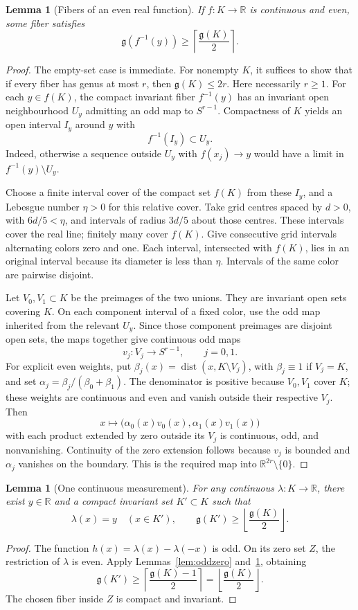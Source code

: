 \documentclass[11pt,a4paper]{article}
\newtheorem{lemma}[theorem]{Lemma}
\theoremstyle{remark}
\newcommand{\R}{\mathbb R}
\newcommand{\gen}{\mathfrak g}
\newcommand{\dist}{\operatorname{dist}}
\begin{document}
\begin{lemma}[Fibers of an even real function]\label{lem:evenfiber}
If $f:K\to\R$ is continuous and even, some fiber satisfies
\[
 \gen(f^{-1}(y))\ge\left\lceil\frac{\gen(K)}2\right\rceil.
\]
\end{lemma}
\begin{proof}
The empty-set case is immediate. For nonempty $K$, it suffices to show that if every fiber has genus at most $r$, then $\gen(K)\le2r$. Here necessarily $r\ge1$. For each $y\in f(K)$, the compact invariant fiber $f^{-1}(y)$ has an invariant open neighbourhood $U_y$ admitting an odd map to $S^{r-1}$. Compactness of $K$ yields an open interval $I_y$ around $y$ with
\[
 f^{-1}(I_y)\subset U_y.
\]
Indeed, otherwise a sequence outside $U_y$ with $f(x_j)\to y$ would have a limit in $f^{-1}(y)\setminus U_y$.

Choose a finite interval cover of the compact set $f(K)$ from these $I_y$, and a Lebesgue number $\eta>0$ for this relative cover. Take grid centres spaced by $d>0$, with $6d/5<\eta$, and intervals of radius $3d/5$ about those centres. These intervals cover the real line; finitely many cover $f(K)$. Give consecutive grid intervals alternating colors zero and one. Each interval, intersected with $f(K)$, lies in an original interval because its diameter is less than $\eta$. Intervals of the same color are pairwise disjoint.

Let $V_0,V_1\subset K$ be the preimages of the two unions. They are invariant open sets covering $K$. On each component interval of a fixed color, use the odd map inherited from the relevant $U_y$. Since those component preimages are disjoint open sets, the maps together give continuous odd maps
\[
 v_j:V_j\to S^{r-1},\qquad j=0,1.
\]
For explicit even weights, put $\beta_j(x)=\dist(x,K\setminus V_j)$, with $\beta_j\equiv1$ if $V_j=K$, and set $\alpha_j=\beta_j/(\beta_0+\beta_1)$. The denominator is positive because $V_0,V_1$ cover $K$; these weights are continuous and even and vanish outside their respective $V_j$. Then
\[
 x\longmapsto\bigl(\alpha_0(x)v_0(x),\alpha_1(x)v_1(x)\bigr)
\]
with each product extended by zero outside its $V_j$ is continuous, odd, and nonvanishing. Continuity of the zero extension follows because $v_j$ is bounded and $\alpha_j$ vanishes on the boundary. This is the required map into $\R^{2r}\setminus\{0\}$.
\end{proof}

\begin{lemma}[One continuous measurement]\label{lem:onefiber}
For any continuous $\lambda:K\to\R$, there exist $y\in\R$ and a compact invariant set $K'\subset K$ such that
\[
 \lambda(x)=y\quad(x\in K'),\qquad
 \gen(K')\ge\left\lfloor\frac{\gen(K)}2\right\rfloor.
\]
\end{lemma}
\begin{proof}
The function $h(x)=\lambda(x)-\lambda(-x)$ is odd. On its zero set $Z$, the restriction of $\lambda$ is even. Apply Lemmas~\ref{lem:oddzero} and~\ref{lem:evenfiber}, obtaining
\[
 \gen(K')\ge\left\lceil\frac{\gen(K)-1}{2}\right\rceil
 =\left\lfloor\frac{\gen(K)}2\right\rfloor.
\]
The chosen fiber inside $Z$ is compact and invariant.
\end{proof}
\end{document}

